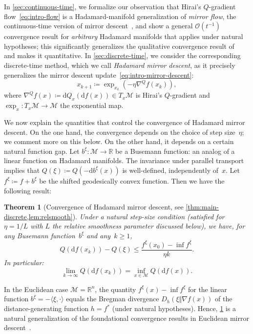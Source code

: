 \documentclass[11pt,letterpaper]{article}
\newtheorem{theorem}{Theorem}[section]
\numberwithin{equation}{section}
\newcommand{\RR}{\mathbb{R}}
\newcommand{\diff}{\mathrm{d}}
\newcommand{\MM}{\mathcal{M}}
\begin{document}
In \cref{sec:continuous-time}, we formalize our observation that Hirai's $Q$-gradient flow~\eqref{eq:intro-flow} is a Hadamard-manifold generalization of \emph{mirror flow}, the continuous-time version of mirror descent~\cite{NY1983}, and show a general $\mathcal{O}(t^{-1})$ convergence result for \emph{arbitrary} Hadamard manifolds that applies under natural hypotheses; this significantly generalizes the qualitative convergence result of~\cite{Hirai2025} and makes it quantitative.
In \cref{sec:discrete-time}, we consider the corresponding discrete-time method, which we call \emph{Hadamard mirror descent}, as it precisely generalizes the mirror descent update~\eqref{eq:intro-mirror-descent}:
\begin{equation}\label{eq:intro-Hadamard-mirror-descent}
    x_{k+1} \coloneqq \exp_{x_k}( -\eta \nabla^Q f(x_k) ),
\end{equation}
where $\nabla^Q f(x)\coloneqq \diff Q_x (\diff f(x)) \in T_x\MM$ is Hirai's $Q$-gradient and $\exp_x \colon T_x\MM\rightarrow \MM$ the exponential map.

We now explain the quantities that control the convergence of Hadamard mirror descent.
On the one hand, the convergence depends on the choice of step size~$\eta$; we comment more on this below.
On the other hand, it depends on a certain natural function gap.
Let $b^\xi \colon \MM \to \RR$ be a Busemann function: an analog of a linear function on Hadamard manifolds.
The invariance under parallel transport implies that $Q(\xi) \coloneqq Q(-\diff b^\xi(x))$ is well-defined, independently of~$x$.
Let $f^\xi \coloneqq f + b^\xi$ be the shifted geodesically convex function.
Then we have the following result:

\begin{theorem}[Convergence of Hadamard mirror descent, see \cref{thm:main-discrete,lem:relsmooth}]\label{thm:intro-main}
    Under a natural step-size condition (satisfied for $\eta=1/L$ with $L$ the relative smoothness parameter discussed below), we have, for any Busemann function~$b^\xi$ and any~$k\geq1$,
    \[
        Q(\diff f(x_k)) - Q(\xi) \leq \frac{f^\xi(x_0) - \inf f^\xi}{\eta k}.
    \]
    In particular:
    \[
        \lim_{k \to \infty}Q(\diff f(x_k)) = \inf_{x \in \MM}Q(\diff f(x)).
    \]
\end{theorem}
\noindent
In the Euclidean case $\MM = \RR^n$, the quantity $f^\xi(x) - \inf f^\xi$ for the linear function $b^\xi = -\langle \xi, \cdot\rangle$ equals the Bregman divergence $D_h(\xi\Vert\nabla f(x))$ of the distance-generating function $h = f^\ast$ (under natural hypotheses).
Hence, \cref{thm:intro-main} is a natural generalization of the foundational convergence results in Euclidean mirror descent~\cite{BBT2017,LFN2018}.
\end{document}
